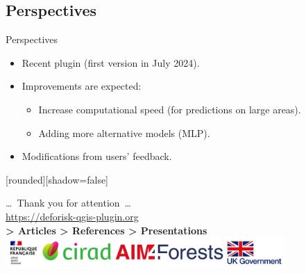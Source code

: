 \documentclass[10pt,table,dvipsnames,compress]{beamer}
\begin{document}
\subsection{Perspectives}
\label{sec:org679384f}

\begin{frame}[label={sec:org1c4e543}]{Perspectives}
\begin{itemize}
\item Recent plugin (first version in July 2024).
\item Improvements are expected:
\begin{itemize}
\item Increase computational speed (for predictions on large areas).
\item Adding more alternative models (MLP).
\end{itemize}
\item Modifications from users' feedback.
\end{itemize}
\end{frame}


{
  [rounded][shadow=false]
  \begin{frame}[plain]
    \begin{block}{}
      \begin{center}
        \ldots~Thank you for attention~\ldots \\
        \url{https://deforisk-qgis-plugin.org} \\
        \textbf{> Articles > References > Presentations} \\
        \includegraphics[width=0.8\textwidth]{figs/partners_logos}
      \end{center}
    \end{block}
  \end{frame}
}
\end{document}
